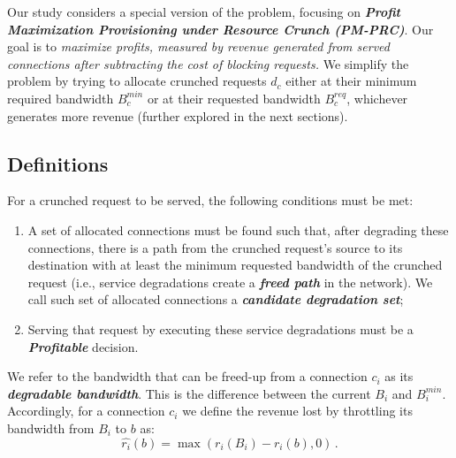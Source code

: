 \documentclass[journal]{IEEEtran}
\begin{document}
Our study considers a special version of the problem, focusing on \textbf{\textit{Profit Maximization Provisioning under Resource Crunch (PM-PRC)}}. Our goal is to \textit{maximize profits, measured by revenue generated from served connections after subtracting the cost of blocking requests.} We simplify the problem by trying to allocate crunched requests $d_c$ either at their minimum required bandwidth $B_{c}^{min}$ or at their requested bandwidth $B_{c}^{req}$, whichever generates more revenue (further explored in the next sections).

\subsection{Definitions} \label{ssec:definitions}

For a crunched request to be served, the following conditions must be met:
\begin{enumerate}[label=\textit{\alph*.}]
 \item A set of allocated connections must be found such that, after degrading these connections, there is a path from the crunched request's source to its destination with at least the minimum requested bandwidth of the crunched request (i.e., service degradations create a \textbf{\textit{freed path}} in the network).
 We call such set of allocated connections a \textbf{\textit{candidate degradation set}};
 \item Serving that request by executing these service degradations must be a \textbf{\textit{Profitable}} decision.
\end{enumerate}

We refer to the bandwidth that can be freed-up from a connection $c_i$ as its \textbf{\textit{degradable bandwidth}}. This is the difference between the current $B_{i}$ and $B_{i}^{min}$. Accordingly, for a connection $c_i$ we define the revenue lost by throttling its bandwidth from $B_{i}$ to $b$ as:
$$\widehat{r_{i}}(b) = \max (r_{i}(B_{i}) - r_{i}(b), 0) \,.$$
\end{document}
